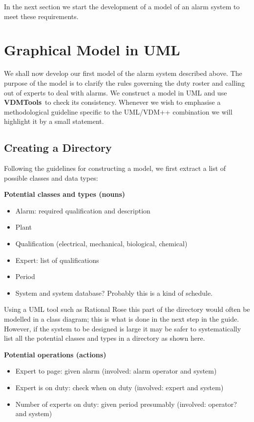 \documentclass[\pformat,12pt,twoside]{article}
\newcommand{\vdmtools}{\textbf{VDMTools}}
\begin{document}
In the next section we start the development of a model of an 
alarm system to meet these requirements.

\section{Graphical Model in UML}

We shall now develop our first model of the alarm system described 
above. The purpose of the model is to clarify the rules governing 
the duty roster and calling out of experts to deal with alarms. 
We construct a model in UML and use \vdmtools\ to check its consistency. 
Whenever we wish to emphasise a methodological guideline specific 
to the UML/VDM++ combination we will highlight it by a small 
statement. 

\subsection{Creating a Directory}

Following the guidelines for constructing a model, we first extract 
a list of possible classes and data types:

\textbf{Potential classes and types (nouns)}
\begin{itemize}
\item Alarm: required qualification and description
\item Plant
\item Qualification (electrical, mechanical, biological, chemical)
\item Expert: list of qualifications
\item Period 
\item System and system database? Probably this is a kind of schedule.
\end{itemize}

Using a UML tool such as Rational Rose this part of the directory 
would often be modelled in a class diagram; this is what is done 
in the next step in the guide. However, if the system to be designed 
is large it may be safer to systematically list all the potential 
classes and types in a directory as shown here.

\textbf{Potential operations (actions)}
\begin{itemize}
\item Expert to page: given alarm (involved: alarm operator and system)
\item Expert is on duty: check when on duty (involved: expert and system)
\item Number of experts on duty: given period presumably (involved: 
operator? and system)
\end{itemize}
\end{document}
